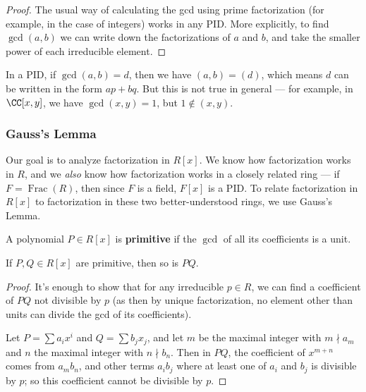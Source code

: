 \begin{proof}
    The usual way of calculating the gcd using prime factorization (for example, in the case of integers) works in any PID. More explicitly, to find $\gcd(a, b)$ we can write down the factorizations of $a$ and $b$, and take the smaller power of each irreducible element. 
\end{proof}


\begin{note}
    In a PID, if $\gcd(a, b) = d$, then we have $(a, b) = (d)$, which means $d$ can be written in the form $ap + bq$. But this is not true in general --- for example, in $\CC[x, y]$, we have $\gcd(x, y) = 1$, but $1 \not\in (x, y)$. 
\end{note}

\subsubsection{Gauss's Lemma}

Our goal is to analyze factorization in $R[x]$. We know how factorization works in $R$, and we \emph{also} know how factorization works in a closely related ring --- if $F = \operatorname{Frac}(R)$, then since $F$ is a field, $F[x]$ is a PID. To relate factorization in $R[x]$ to factorization in these two better-understood rings, we use Gauss's Lemma. 

\begin{definition}
 A polynomial $P \in R[x]$ is \textbf{primitive} if the $\gcd$ of all its coefficients is a unit. 
\end{definition}

\begin{lemma}
    If $P, Q \in R[x]$ are primitive, then so is $PQ$. 
\end{lemma}

\begin{proof}
    It's enough to show that for any irreducible $p \in R$, we can find a coefficient of $PQ$ not divisible by $p$ (as then by unique factorization, no element other than units can divide the gcd of its coefficients). 

    Let $P = \sum a_ix^i$ and $Q = \sum b_jx_j$, and let $m$ be the maximal integer with $m \nmid a_m$ and $n$ the maximal integer with $n \nmid b_n$. Then in $PQ$, the coefficient of $x^{m + n}$ comes from $a_mb_n$, and other terms $a_ib_j$ where at least one of $a_i$ and $b_j$ is divisible by $p$; so this coefficient cannot be divisible by $p$. 
\end{proof}

